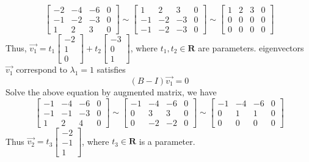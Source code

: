 \documentclass{article}
\begin{document}
\[
\left[\begin{array}{rrrr}
-2 & -4 & -6 & 0 \\
-1 & -2 & -3 & 0  \\
 1 &  2 &  3 & 0 
\end{array}\right]
\sim
\left[\begin{array}{rrrr}
 1 &  2 & 3 & 0  \\
-1 & -2 & -3 & 0  \\
-1 & -2 & -3 & 0 
\end{array}\right]
\sim 
\left[\begin{array}{rrrr}
 1 &  2 & 3 & 0  \\
 0 &  0 & 0 & 0  \\
 0 &  0 & 0 & 0 
\end{array}\right]
\]
Thus, $\Vec{v_1}=t_1\left[\begin{array}{r}-2\\1\\0\end{array}\right]+t_2\left[\begin{array}{r}-3\\0\\1\end{array}\right]$, where $t_1,t_2\in \mathbf{R}$ are parameters.\newline
eigenvectors $\Vec{v_1}$ correspond to $\lambda_1=1$ satisfies
\[(B-I)\Vec{v_1}=0\]
Solve the above equation by augmented matrix, we have
\[
\left[\begin{array}{rrrr}
-1 & -4 & -6 & 0 \\
-1 & -1 & -3 & 0  \\
 1 &  2 &  4 & 0 
\end{array}\right]
\sim
\left[\begin{array}{rrrr}
-1 & -4 & -6 & 0 \\
 0 &  3 &  3 & 0  \\
 0 & -2 & -2 & 0 
\end{array}\right]
\sim
\left[\begin{array}{rrrr}
-1 & -4 & -6 & 0 \\
 0 &  1 &  1 & 0  \\
 0 &  0 &  0 & 0 
\end{array}\right]
\]
Thus $\Vec{v_2}=t_3\left[\begin{array}{r}-2\\-1\\1\end{array}\right]$, where $t_3\in \mathbf{R}$ is a parameter.\newline
\end{document}
